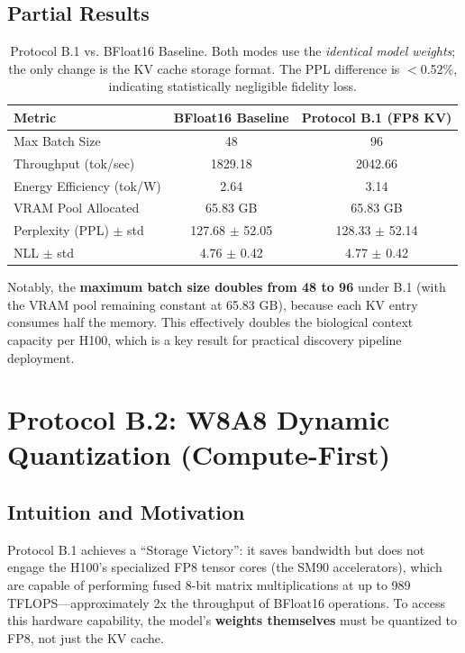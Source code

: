 \documentclass[12pt]{article}
\begin{document}
\subsection{Partial Results}

\begin{table}[h]
\centering
\begin{tabular}{lcc}
\toprule
\textbf{Metric} & \textbf{BFloat16 Baseline} & \textbf{Protocol B.1 (FP8 KV)} \\
\midrule
Max Batch Size             & 48    & 96    \\
Throughput (tok/sec)       & 1829.18 & 2042.66 \\
Energy Efficiency (tok/W)  & 2.64  & 3.14  \\
VRAM Pool Allocated        & 65.83 GB & 65.83 GB \\
\midrule
Perplexity (PPL) $\pm$ std    & 127.68 $\pm$ 52.05 & 128.33 $\pm$ 52.14 \\
NLL $\pm$ std                 & 4.76 $\pm$ 0.42 & 4.77 $\pm$ 0.42 \\
\bottomrule
\end{tabular}
\caption{Protocol B.1 vs. BFloat16 Baseline. Both modes use the \emph{identical model weights}; the only change is the KV cache storage format. The PPL difference is $<$0.52\%, indicating statistically negligible fidelity loss.}
\end{table}

Notably, the \textbf{maximum batch size doubles from 48 to 96} under B.1 (with the VRAM pool remaining constant at 65.83 GB), because each KV entry consumes half the memory. This effectively doubles the biological context capacity per H100, which is a key result for practical discovery pipeline deployment.


\section{Protocol B.2: W8A8 Dynamic Quantization (Compute-First)}

\subsection{Intuition and Motivation}

Protocol B.1 achieves a ``Storage Victory'': it saves bandwidth but does not engage the H100's specialized FP8 tensor cores (the SM90 accelerators), which are capable of performing fused 8-bit matrix multiplications at up to 989 TFLOPS---approximately 2x the throughput of BFloat16 operations. To access this hardware capability, the model's \textbf{weights themselves} must be quantized to FP8, not just the KV cache.
\end{document}
